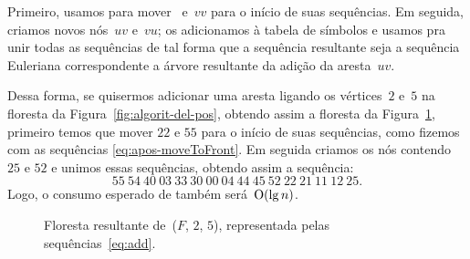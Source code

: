 Primeiro, usamos \ETmovetofront{} para mover~ e~$vv$ para o início de suas sequências.
Em seguida, criamos novos nós~$uv$ e~$vu$; os adicionamos à tabela de símbolos e usamos \treapJoin{} pra unir todas as sequências de tal forma que a sequência resultante seja a sequência Euleriana correspondente a árvore resultante da adição da aresta~$uv$.

Dessa forma, se quisermos adicionar uma aresta ligando os vértices~$2$ e~$5$ na floresta da Figura~\ref{fig:algorit-del-pos}, obtendo assim a floresta da Figura~\ref{fig:algorit-add-pos}, primeiro temos que mover $22$ e $55$ para o início de suas sequências, como fizemos com as sequências \eqref{eq:apos-moveToFront}. Em seguida criamos os nós contendo $25$ e $52$ e unimos essas sequências, obtendo assim a sequência:
\begin{equation}
55~54~40~03~33~30~00~04~44~45~52~22~21~11~12~25.\label{eq:add}
\end{equation}
Logo, o consumo esperado de \dymForestAddEdge{} também será~$\mathrm{O}(\lg n)$.

\begin{figure}[htb]
\centering

\caption{Floresta resultante de~\dymForestAddEdge($F$, $2$, $5$), representada pelas sequências~\eqref{eq:add}.}
\label{fig:algorit-add-pos}
\end{figure}
